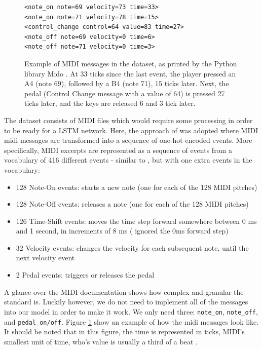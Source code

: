 \documentclass[a4paper]{book}
\begin{document}
\begin{figure}[t]
    \centering
    \begin{verbatim}
<note_on note=69 velocity=73 time=33>
<note_on note=71 velocity=78 time=15>
<control_change control=64 value=83 time=27>
<note_off note=69 velocity=0 time=6>
<note_off note=71 velocity=0 time=3>
    \end{verbatim}
    \caption{Example of MIDI messages in the dataset, as printed by the Python library Mido \parencite{bjorndalen_mido_2018}. At 33 ticks since the last event, the player pressed an A4 (note 69), followed by a B4 (note 71), 15 ticks later. Next, the pedal (Control Change message with a value of 64) is pressed 27 ticks later, and the keys are released 6 and 3 tick later.}
    \label{fig:midi_examples}
\end{figure}

The dataset consists of MIDI files which would require some processing in order to be ready for a LSTM network. Here, the approach of \textcite{oore_this_2018} was adopted where MIDI midi messages are transformed into a sequence of one-hot encoded events. More specifically, MIDI excerpts are represented as a sequence of events from a vocabulary of 416 different events - similar to \textcite{oore_this_2018}, but with one extra events in the vocabulary:
\begin{itemize}
    \item 128 Note-On events: starts a new note (one for each of the 128 MIDI pitches)
    \item 128 Note-Off events: releases a note (one for each of the 128 MIDI pitches)
    \item 126 Time-Shift events: moves the time step forward somewhere between 0 ms and 1 second, in increments of 8 ms (\textcite{oore_this_2018} ignored the 0ms forward step)
    \item 32 Velocity events: changes the velocity for each subsequent note, until the next velocity event
    \item 2 Pedal events: triggers or releases the pedal
\end{itemize}

A glance over the MIDI documentation \parencite{midi_association_official_2019} shows how complex and granular the standard is. Luckily however, we do not need to implement all of the messages into our model in order to make it work. We only need three: \texttt{note\_on}, \texttt{note\_off}, and \texttt{pedal\_on/off}. Figure \ref{fig:midi_examples} show an example of how the midi messages look like. It should be noted that in this figure, the time is represented in ticks, MIDI's smallest unit of time, who's value is usually a third of a beat \parencite{midi_association_official_2019}.
\end{document}
